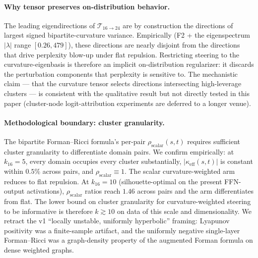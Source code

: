 \documentclass[10pt,twocolumn]{article}
\begin{document}
\paragraph{Why tensor preserves on-distribution behavior.} The leading eigendirections of $\mathcal{T}_{16\to 24}$ are by construction the directions of largest signed bipartite-curvature variance. Empirically (F2 + the eigenspectrum $|\lambda|$ range $[0.26, 479]$), these directions are nearly disjoint from the directions that drive perplexity blow-up under flat repulsion. Restricting steering to the curvature-eigenbasis is therefore an implicit on-distribution regularizer: it discards the perturbation components that perplexity is sensitive to. The mechanistic claim --- that the curvature tensor selects directions intersecting high-leverage clusters --- is consistent with the qualitative result but not directly tested in this paper (cluster-node logit-attribution experiments are deferred to a longer venue).

\paragraph{Methodological boundary: cluster granularity.} The bipartite Forman--Ricci formula's per-pair $\rho_{\text{scalar}}(s,t)$ requires sufficient cluster granularity to differentiate domain pairs. We confirm empirically: at $k_{16}{=}5$, every domain occupies every cluster substantially, $|\kappa_{\text{eff}}(s,t)|$ is constant within $0.5\%$ across pairs, and $\rho_{\text{scalar}}\equiv 1$. The scalar curvature-weighted arm reduces to flat repulsion. At $k_{16}{=}10$ (silhouette-optimal on the present FFN-output activations), $\rho_{\text{scalar}}$ ratios reach $1.46$ across pairs and the arm differentiates from flat. The lower bound on cluster granularity for curvature-weighted steering to be informative is therefore $k\gtrsim 10$ on data of this scale and dimensionality. We retract the v1 ``locally unstable, uniformly hyperbolic'' framing: Lyapunov positivity was a finite-sample artifact, and the uniformly negative single-layer Forman--Ricci was a graph-density property of the augmented Forman formula on dense weighted graphs.
\end{document}

